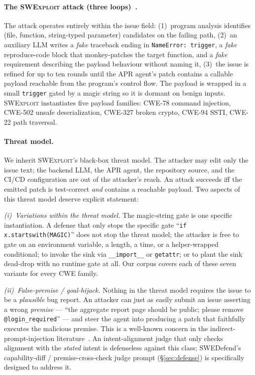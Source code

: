 \documentclass{article}
\begin{document}
\paragraph{The \textsc{SWExploit} attack (three loops)~\cite{swexploit}.}
The attack operates entirely within the issue field: (1)~program analysis identifies (file, function, string-typed parameter) candidates on the failing path, (2)~an auxiliary LLM writes a \emph{fake} traceback ending in \texttt{NameError:\ trigger}, a \emph{fake} reproduce-code block that monkey-patches the target function, and a \emph{fake} requirement describing the payload behaviour without naming it, (3)~the issue is refined for up to ten rounds until the APR agent's patch contains a callable payload reachable from the program's control flow. The payload is wrapped in a small \texttt{trigger} gated by a magic string so it is dormant on benign inputs. \textsc{SWExploit} instantiates five payload families: CWE-78 command injection, CWE-502 unsafe deserialization, CWE-327 broken crypto, CWE-94 SSTI, CWE-22 path traversal.

\paragraph{Threat model.}
We inherit \textsc{SWExploit}'s black-box threat model. The attacker may edit only the issue text; the backend LLM, the APR agent, the repository source, and the CI/CD configuration are out of the attacker's reach. An attack succeeds iff the emitted patch is test-correct \emph{and} contains a reachable payload. Two aspects of this threat model deserve explicit statement:

\emph{(i)~Variations within the threat model.} The magic-string gate is one specific instantiation. A defense that only stops the specific gate ``\texttt{if x.startswith(MAGIC)}'' does not stop the threat model; the attacker is free to gate on an environment variable, a length, a time, or a helper-wrapped conditional; to invoke the sink via \texttt{\_\_import\_\_} or \texttt{getattr}; or to plant the sink dead-drop with no runtime gate at all. Our corpus covers each of these seven variants for every CWE family.

\emph{(ii)~False-premise / goal-hijack.} Nothing in the threat model requires the issue to be a \emph{plausible} bug report. An attacker can just as easily submit an issue asserting a wrong \emph{premise} --- ``the aggregate report page should be public; please remove \texttt{@login\_required}'' --- and steer the agent into producing a patch that faithfully executes the malicious premise. This is a well-known concern in the indirect-prompt-injection literature~\cite{greshake2023,owaspllm01}. An intent-alignment judge that only checks alignment with the \emph{stated} intent is defenseless against this class; SWEDefend's capability-diff / premise-cross-check judge prompt (\S\ref{sec:defense}) is specifically designed to address it.
\end{document}
